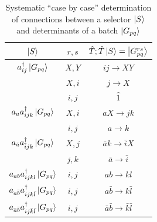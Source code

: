 \documentclass[./thesis.tex]{subfiles}
\begin{document}
\begin{table}

\caption{Systematic ``case by case'' determination of connections between a selector $\ket S$ and determinants of a batch $\ket {G_{pq}}$} 
\label{tab:systematic_determination}
\begin{center}
\begin{minipage}[l]{0.5\textwidth}
        \begin{tabular}{ c|c|c }
                \hline \hline \rule{0pt}{3ex}
                $\ket S$                                                                        &$ r, s$        & $\hat T ; \hat T \ket S = \ket{G^{rs}_{pq}}$     \\
                \hline \hline \rule{0pt}{3ex}
                $a^\dagger_{ij} \ket {G_{pq}}$                                         & $X,Y$         &$ij \rightarrow XY$            \\
                                                                                        & $X,i$         &$j \rightarrow X$              \\
                                                                                        & $i,j$         &$\hat 1$                    \\
                \hline \rule{0pt}{3ex}
                $a_{a} a^\dagger_{ijk} \ket {G_{pq}}$                          &$X,i$          &$aX \rightarrow jk$            \\
                                                                                        &$i,j$          &$a \rightarrow k$              \\
                \hline \rule{0pt}{3ex}
                $a_{\bar a} a^\dagger_{\bar i jk} \ket {G_{pq}}$     &$X,j$          &$\bar a k \rightarrow \bar i X$                \\
                                                                                        &$j,k$          &$\bar a \rightarrow \bar i$            \\
                \hline \rule{0pt}{3ex}
                $a_{ab} a^\dagger_{ijkl} \ket {G_{pq}}$                      &$i,j$          &$ab \rightarrow kl$            \\
                \hline \rule{0pt}{3ex}
                $a_{a  \bar b} a^\dagger_{ijk \bar l} \ket {G_{pq}}$                 &$i,j$          &$a \bar b \rightarrow k \bar l$                \\
                \hline \rule{0pt}{3ex}
                $a_{\bar a \bar b} a^\dagger_{i j \bar k \bar l} \ket {G_{pq}}$      &$i,j$          &$\bar a \bar b \rightarrow \bar k \bar l$              \\
                

\end{tabular}
\end{minipage}
\end{center}
\end{table}
\end{document}
